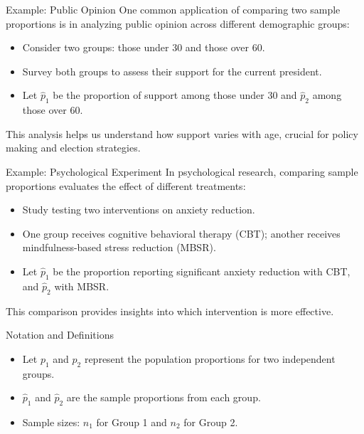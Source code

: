 \documentclass[handout]{beamer} %
\begin{document}
\begin{frame}{Example: Public Opinion}
  One common application of comparing two sample proportions is in analyzing public opinion across different demographic groups:
  \begin{itemize}
    \item Consider two groups: those under 30 and those over 60.
    \item Survey both groups to assess their support for the current president.
    \item Let $\hat{p}_1$ be the proportion of support among those under 30 and $\hat{p}_2$ among those over 60.
  \end{itemize}
  This analysis helps us understand how support varies with age, crucial for policy making and election strategies.
\end{frame}

\begin{frame}{Example: Psychological Experiment}
  In psychological research, comparing sample proportions evaluates the effect of different treatments:
  \begin{itemize}
    \item Study testing two interventions on anxiety reduction.
    \item One group receives cognitive behavioral therapy (CBT); another receives mindfulness-based stress reduction (MBSR).
    \item Let $\hat{p}_1$ be the proportion reporting significant anxiety reduction with CBT, and $\hat{p}_2$ with MBSR.
  \end{itemize}
  This comparison provides insights into which intervention is more effective.
\end{frame}

\begin{frame}{Notation and Definitions}
  \begin{itemize}
    \item Let $p_1$ and $p_2$ represent the population proportions for two independent groups.
    \item $\hat{p}_1$ and $\hat{p}_2$ are the sample proportions from each group.
    \item Sample sizes: $n_1$ for Group 1 and $n_2$ for Group 2.
  \end{itemize}
\end{frame}
\end{document}
